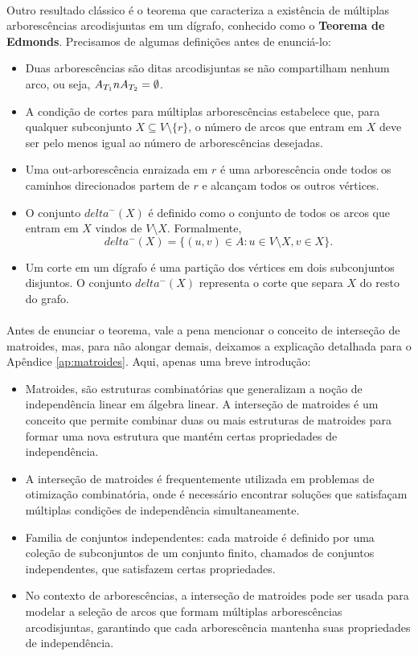 \documentclass[12pt,a4paper]{article}
\def\emph#1{#1}%
\def\cap{\string n}%
\def\delta{delta}%
\begin{document}
\paragraph{}
Outro resultado clássico é o teorema que caracteriza a existência de múltiplas arborescências arcodisjuntas em um dígrafo, conhecido como o \textbf{Teorema de Edmonds}. Precisamos de algumas definições antes de enunciá-lo:

\begin{itemize}
    \item Duas arborescências são ditas \emph{arcodisjuntas} se não compartilham nenhum arco, ou seja, \(A_{T_1} \cap A_{T_2} = \emptyset\).
    \item A condição de cortes para múltiplas arborescências estabelece que, para qualquer subconjunto \(X \subseteq V \setminus \{r\}\), o número de arcos que entram em \(X\) deve ser pelo menos igual ao número de arborescências desejadas.
    \item Uma out-arborescência enraizada em \(r\) é uma arborescência onde todos os caminhos direcionados partem de \(r\) e alcançam todos os outros vértices.
    \item O conjunto \(\delta^-(X)\) é definido como o conjunto de todos os arcos que entram em \(X\) vindos de \(V \setminus X\). Formalmente,
    \[
    \delta^-(X) = \{(u, v) \in A : u \in V \setminus X, v \in X\}.
    \]
    \item Um corte em um dígrafo é uma partição dos vértices em dois subconjuntos disjuntos. O conjunto \(\delta^-(X)\) representa o corte que separa \(X\) do resto do grafo.
    \end{itemize}

\paragraph{}
Antes de enunciar o teorema, vale a pena mencionar o conceito de \emph{interseção de matroides}, mas, para não alongar demais, deixamos a explicação detalhada para o Apêndice \ref{ap:matroides}. Aqui, apenas uma breve introdução:
\begin{itemize}
    \item Matroides, são estruturas combinatórias que generalizam a noção de independência linear em álgebra linear. A interseção de matroides é um conceito que permite combinar duas ou mais estruturas de matroides para formar uma nova estrutura que mantém certas propriedades de independência.
    \item A interseção de matroides é frequentemente utilizada em problemas de otimização combinatória, onde é necessário encontrar soluções que satisfaçam múltiplas condições de independência simultaneamente.
    \item Familia de conjuntos independentes: cada matroide é definido por uma coleção de subconjuntos de um conjunto finito, chamados de conjuntos independentes, que satisfazem certas propriedades.
    \item No contexto de arborescências, a interseção de matroides pode ser usada para modelar a seleção de arcos que formam múltiplas arborescências arcodisjuntas, garantindo que cada arborescência mantenha suas propriedades de independência.
\end{itemize}
\end{document}
